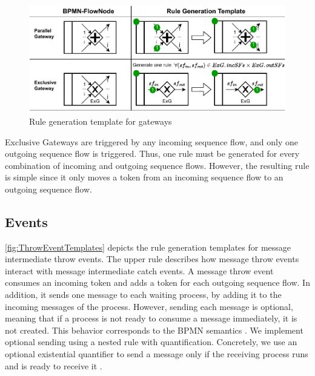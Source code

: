 \documentclass[submission, copyright, creativecommons]{eptcs}
\begin{document}
\begin{figure}[h]
    \centering
    \includegraphics[width=1\textwidth]{images/gateways_template.pdf}
    \caption{Rule generation template for gateways}
    \label{fig:GatewayTemplates}
\end{figure}

Exclusive Gateways are triggered by any incoming sequence flow, and only one outgoing sequence flow is triggered.
Thus, one rule must be generated for every combination of incoming and outgoing sequence flows.
However, the resulting rule is simple since it only moves a token from an incoming sequence flow to an outgoing sequence flow.

\subsection{Events}
\autoref{fig:ThrowEventTemplates} depicts the rule generation templates for message intermediate throw events.
The upper rule describes how message throw events interact with message intermediate catch events.
A message throw event consumes an incoming token and adds a token for each outgoing sequence flow.
In addition, it sends one message to each waiting process, by adding it to the incoming messages of the process.
However, sending each message is optional, meaning that if a process is not ready to consume a message immediately, it is not created.
This behavior corresponds to the BPMN semantics \cite{objectmanagementgroupBusinessProcessModel2013}.
We implement optional sending using a nested rule with quantification.
Concretely, we use an optional existential quantifier to send a message only if the receiving process runs and is ready to receive it \cite{rensinkNestedQuantificationGraph2006}.
\end{document}
